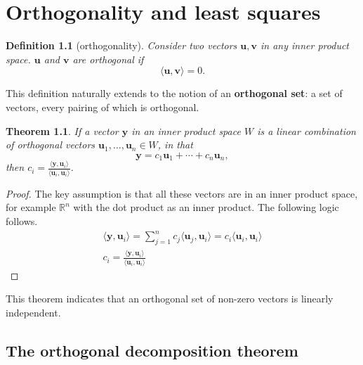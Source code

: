\documentclass[draft,12pt]{report}
\newtheorem{theorem}{Theorem}
\newtheorem{definition}{Definition}
\renewcommand{\vec}[1]{\mathbf{#1}}
\begin{document}
\chapter{Orthogonality and least squares}

\begin{definition}[orthogonality]
    Consider two vectors $\vec{u}, \vec{v}$ in any inner product space. $\vec{u}$ and $\vec{v}$ are orthogonal if
    \[ \langle \vec{u}, \vec{v} \rangle = 0. \]
\end{definition}
\noindent
This definition naturally extends to the notion of an \textbf{orthogonal set}: a set of vectors, every pairing of which is orthogonal.

\begin{theorem}
    If a vector $\vec{y}$ in an inner product space $W$ is a linear combination of orthogonal vectors $\vec{u}_1, \ldots, \vec{u}_n \in W$, in that
    \[ \vec{y} = c_1 \vec{u}_1 + \cdots + c_n \vec{u}_n, \]
    then $c_i = \frac{\langle \vec{y}, \vec{u}_i \rangle}{\langle \vec{u}_i, \vec{u}_i \rangle}$.
\end{theorem}
\begin{proof}
    The key assumption is that all these vectors are in an inner product space, for example $\mathbb R^n$ with the dot product as an inner product. The following logic follows.
    \begin{gather*}
        \langle \vec{y}, \vec{u}_i \rangle = \sum_{j = 1}^n c_j \langle \vec{u}_j, \vec{u}_i \rangle = c_i \langle \vec{u}_i, \vec{u}_i \rangle \\
        c_i = \frac{\langle \vec{y}, \vec{u}_i \rangle}{\langle \vec{u}_i, \vec{u}_i \rangle}
    \end{gather*}
\end{proof}
This theorem indicates that an orthogonal set of non-zero vectors is linearly independent.

\section{The orthogonal decomposition theorem}
\end{document}

